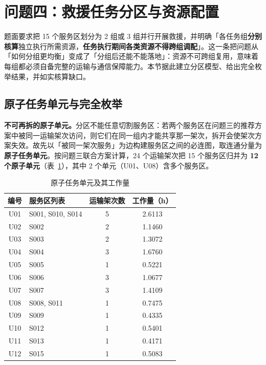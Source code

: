 \section{问题四：救援任务分区与资源配置}

题面要求把 15 个服务区划分为 2 组或 3 组并行开展救援，并明确「各任务组\textbf{分别核算}独立执行所需资源，\textbf{任务执行期间各类资源不得跨组调配}」。这一条把问题从「如何分组更均衡」变成了「分组后还能不能落地」：资源不可跨组复用，意味着每组都必须自备完整的运输与通信保障能力。本节据此建立分区模型、给出完全枚举结果，并如实核算缺口。

\subsection{原子任务单元与完全枚举}

\textbf{不可再拆的原子单元。}分区不能任意切割服务区：若两个服务区在问题三的推荐方案中被同一运输架次访问，则它们在同一组内才能共享那一架次，拆开会使架次方案失效。故先以「被同一架次服务」为边构建服务区之间的必连图，取连通分量为\textbf{原子任务单元}。按问题三联合方案计算，24 个运输架次把 15 个服务区归并为 \textbf{12 个原子单元}（表~\ref{tab:q4-units}），其中 2 个单元（U01、U08）含多个服务区。

\begin{table}[htbp]
	\caption{原子任务单元及其工作量}
	\label{tab:q4-units}
	\centering
	\small
	\begin{tabular}{clcc}
		\toprule
		编号 & 服务区列表 & 运输架次数 & 工作量（h） \\
		\midrule
		U01 & S001, S010, S014 & 5 & 2.6113 \\
		U02 & S002 & 2 & 1.1460 \\
		U03 & S003 & 2 & 1.3072 \\
		U04 & S004 & 3 & 1.6760 \\
		U05 & S005 & 1 & 0.5221 \\
		U06 & S006 & 3 & 1.0677 \\
		U07 & S007 & 3 & 1.4109 \\
		U08 & S008, S011 & 1 & 0.7475 \\
		U09 & S009 & 1 & 0.4335 \\
		U10 & S012 & 1 & 0.5401 \\
		U11 & S013 & 1 & 0.4171 \\
		U12 & S015 & 1 & 0.5083 \\
		\bottomrule
	\end{tabular}
\end{table}

